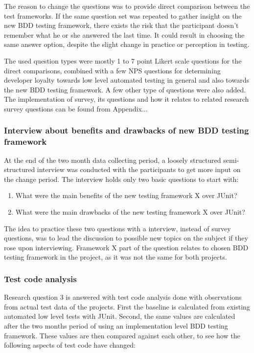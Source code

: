     The reason to change the questions was to provide direct comparison between the test frameworks.
    If the same question set was repeated to gather insight on the new BDD testing framework, there exists the risk that
    the participant doesn't remember what he or she answered the last time. It could result in choosing the same answer option,
    despite the slight change in practice or perception in testing.

    The used question types were mostly 1 to 7 point Likert scale questions for the direct comparisons, combined with a few NPS questions for
    determining developer loyalty towards low level automated testing in general and also towards the new BDD testing framework.
    A few other type of questions were also added.
    The implementation of survey, its questions and how it relates to related research survey questions can be found from Appendix...


    \subsubsection{Interview about benefits and drawbacks of new BDD testing framework}
    At the end of the two month data collecting period, a loosely structured semi-structured interview was conducted with the participants
    to get more input on the change period. The interview holds only two basic questions to start with:
    \begin{enumerate}
    \item What were the main benefits of the new testing framework X over JUnit?
    \item What were the main drawbacks of the new testing framework X over JUnit?
    \end{enumerate}
    The idea to practice these two questions with a interview, instead of survey questions, was to lead the discussion
    to possible new topics on the subject if they rose upon interviewing. Framework X part of the question relates
    to chosen BDD testing framework in the project, as it was not the same for both projects.

    \subsubsection{Test code analysis}
    Research question 3 is answered with test code analysis done with observations from actual test data of the projects.
    First the baseline is calculated from existing automated low level tests with JUnit. Second, the same values are calculated
    after the two months period of using an implementation level BDD testing framework. These values are then compared
    against each other, to see how the following aspects of test code have changed:

